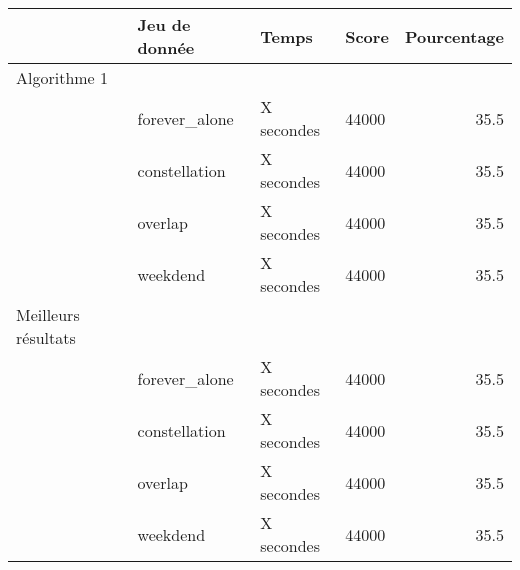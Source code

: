 \documentclass[11pt]{article}
\begin{document}
		\footnotesize
		\hspace*{-1cm}\noindent\begin{tabularx}{16cm}{|l|p{4cm}|X|p{2cm}|r|}
			\hline
			 & \textbf{Jeu de donnée} & \textbf{Temps} & \textbf{Score} & \textbf{Pourcentage} \\
			\hline
		    \cellcolor{blue!25} Algorithme 1 & & & & \\
		    \cellcolor{blue!25} & forever\_alone & X secondes & 44000 & 35.5 \\
		    \cellcolor{blue!25} & constellation & X secondes & 44000 & 35.5 \\
		    \cellcolor{blue!25} & overlap & X secondes & 44000 & 35.5 \\
		    \cellcolor{blue!25} & weekdend & X secondes & 44000 & 35.5 \\
		    \hline
		    \cellcolor{red!25} Meilleurs résultats & & & & \\
		    \cellcolor{red!25} & forever\_alone & X secondes & 44000 & 35.5 \\
		    \cellcolor{red!25} & constellation & X secondes & 44000 & 35.5 \\
		    \cellcolor{red!25} & overlap & X secondes & 44000 & 35.5 \\
		    \cellcolor{red!25} & weekdend & X secondes & 44000 & 35.5 \\
		    \hline
		\end{tabularx}
		\normalsize

\end{document}
